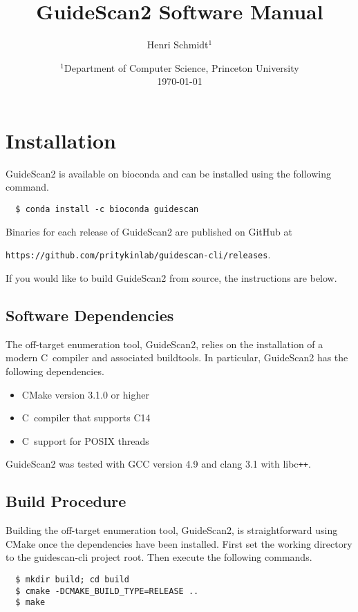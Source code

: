 \documentclass[10pt]{article}
\author{Henri Schmidt$^1$}
\title{GuideScan2 Software Manual}
\date{
    $^1$Department of Computer Science, Princeton University\\[2ex]%
    \today
}
\newcommand{\CC}{C\nolinebreak\hspace{-.05em}\raisebox{.4ex}{\tiny\bf
    +}\nolinebreak\hspace{-.10em}\raisebox{.4ex}{\tiny\bf +}}
\def\CC{{C\nolinebreak[4]\hspace{-.05em}\raisebox{.4ex}{\tiny\bf ++}}}
\begin{document}
\maketitle
\tableofcontents
\newpage

\section{Installation}
GuideScan2 is available on bioconda and can be installed using the
following command.
\begin{verbatim}
  $ conda install -c bioconda guidescan
\end{verbatim}
Binaries for each release of GuideScan2 are published on GitHub 
at
\begin{center}
\texttt{https://github.com/pritykinlab/guidescan-cli/releases}.
\end{center}
If you would like to build GuideScan2 from source, the
instructions are below.
\subsection{Software Dependencies}
The off-target enumeration tool, GuideScan2, relies on the
installation of a modern \CC\ compiler and associated
buildtools. In particular, GuideScan2 has the following dependencies.
\begin{itemize}
\item CMake version 3.1.0 or higher
\item \CC\ compiler that supports \CC14
\item \CC\ support for POSIX threads
\end{itemize}
GuideScan2 was tested with GCC version 4.9 and clang 3.1 with libc\texttt{++}. 

\subsection{Build Procedure}
Building the off-target enumeration tool, GuideScan2, is
straightforward using CMake once the dependencies have been
installed. First set the working directory to the guidescan-cli
project root. Then execute the following commands.

\begin{verbatim}
  $ mkdir build; cd build
  $ cmake -DCMAKE_BUILD_TYPE=RELEASE ..
  $ make
\end{verbatim}
\end{document}
